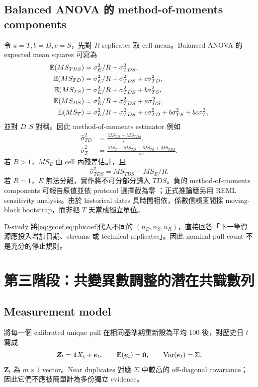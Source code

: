 \documentclass[12pt,a4paper,oneside]{article}
\begin{document}
\subsection{Balanced ANOVA 的 method-of-moments components}

令 $a=T,b=D,c=S$，先對 $R$ replicates 取 cell mean。Balanced ANOVA 的 expected mean squares 可寫為
\begin{align}
\mathbb{E}(MS_{TDS})&=\sigma_E^2/R+\sigma_{TDS}^2,\\
\mathbb{E}(MS_{TD})&=\sigma_E^2/R+\sigma_{TDS}^2+c\sigma_{TD}^2,\\
\mathbb{E}(MS_{TS})&=\sigma_E^2/R+\sigma_{TDS}^2+b\sigma_{TS}^2,\\
\mathbb{E}(MS_{DS})&=\sigma_E^2/R+\sigma_{TDS}^2+a\sigma_{DS}^2,\\
\mathbb{E}(MS_T)&=\sigma_E^2/R+\sigma_{TDS}^2+c\sigma_{TD}^2+b\sigma_{TS}^2+bc\sigma_T^2,
\end{align}
並對 $D,S$ 對稱。因此 method-of-moments estimator 例如
\begin{align}
\widehat\sigma_{TD}^2&=\frac{MS_{TD}-MS_{TDS}}{c},\\
\widehat\sigma_T^2&=\frac{MS_T-MS_{TD}-MS_{TS}+MS_{TDS}}{bc}.
\end{align}
若 $R>1$，$MS_E$ 由 cell 內殘差估計，且
\begin{equation}
\widehat\sigma_{TDS}^2=MS_{TDS}-MS_E/R.
\end{equation}
若 $R=1$，$E$ 無法分離，實作將不可分部分歸入 $TDS$。負的 method-of-moments components 可報告原值並依 protocol 選擇截為零 \cite{searle1992}；正式推論應另用 REML sensitivity analysis。由於 historical dates 具時間相依，係數信賴區間採 moving-block bootstrap，而非把 $T$ 天當成獨立單位。

D-study 將\cref{eq:gcoef,eq:phicoef}代入不同的 $(n_D,n_S,n_R)$，直接回答「下一筆資源應投入增加日期、streams 或 technical replicates」。因此 nominal pull count 不是充分的停止規則。

\section{第三階段：共變異數調整的潛在共識數列}

\subsection{Measurement model}

將每一個 calibrated unique pull 在相同基準期重新設為平均 100 後，對歷史日 $t$ 寫成
\begin{equation}
\bm Z_t=\bm{1} X_t+\bm e_t,
\qquad \mathbb{E}(\bm e_t)=\bm 0,
\qquad \operatorname{Var}(\bm e_t)=\Sigma.
\label{eq:consensusmodel}
\end{equation}
$\bm Z_t$ 為 $m\times1$ vector。Near duplicates 對應 $\Sigma$ 中較高的 off-diagonal covariance；因此它們不應被簡單計為多份獨立 evidence。
\end{document}
